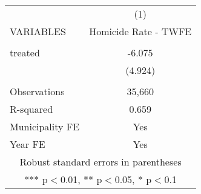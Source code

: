 \documentclass[]{article}
\begin{document}
\begin{tabular}{lc} \hline
 & (1) \\
VARIABLES & Homicide Rate - TWFE \\ \hline
 &  \\
treated & -6.075 \\
 & (4.924) \\
 &  \\
Observations & 35,660 \\
R-squared & 0.659 \\
Municipality FE & Yes \\
 Year FE & Yes \\ \hline
\multicolumn{2}{c}{ Robust standard errors in parentheses} \\
\multicolumn{2}{c}{ *** p$<$0.01, ** p$<$0.05, * p$<$0.1} \\
\end{tabular}
\end{document}
